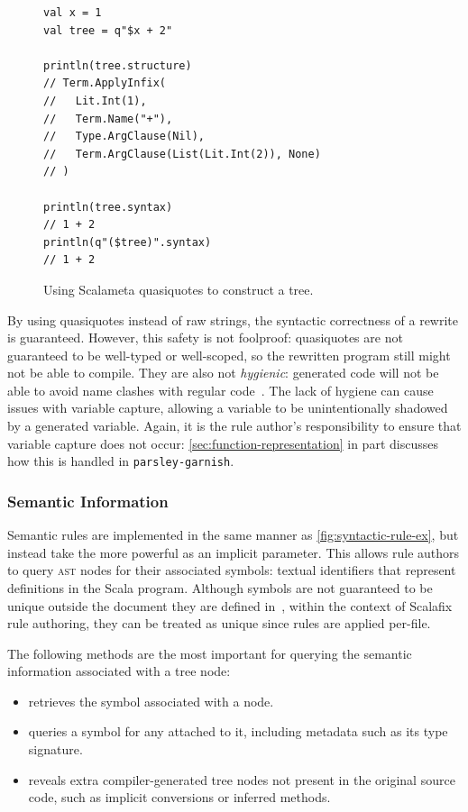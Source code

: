 \documentclass[../../main.tex]{subfiles}
\begin{document}
\begin{figure}[htbp]
\begin{verbatim}
val x = 1
val tree = q"$x + 2"

println(tree.structure)
// Term.ApplyInfix(
//   Lit.Int(1),
//   Term.Name("+"),
//   Type.ArgClause(Nil),
//   Term.ArgClause(List(Lit.Int(2)), None)
// )

println(tree.syntax)
// 1 + 2
println(q"($tree)".syntax)
// 1 + 2
\end{verbatim}
\caption{Using Scalameta quasiquotes to construct a tree.}
\label{fig:quasiquote-ex}
\end{figure}

By using quasiquotes instead of raw strings, the syntactic correctness of a rewrite is guaranteed.
However, this safety is not foolproof: quasiquotes are not guaranteed to be well-typed or well-scoped, so the rewritten program still might not be able to compile.
They are also not \emph{hygienic}: generated code will not be able to avoid name clashes with regular code~\cite{burmako_scalameta_2017}.
The lack of hygiene can cause issues with variable capture, allowing a variable to be unintentionally shadowed by a generated variable.
Again, it is the rule author's responsibility to ensure that variable capture does not occur: \cref{sec:function-representation} in part discusses how this is handled in \texttt{parsley-garnish}.

\subsubsection{Semantic Information}
Semantic rules are implemented in the same manner as \cref{fig:syntactic-rule-ex}, but instead take the more powerful  as an implicit parameter.
This allows rule authors to query \textsc{ast} nodes for their associated symbols: textual identifiers that represent definitions in the Scala program.
Although symbols are not guaranteed to be unique outside the document they are defined in~\cite{scalameta_semanticdb_spec_2023}, within the context of Scalafix rule authoring, they can be treated as unique since rules are applied per-file.

The following methods are the most important for querying the semantic information associated with a tree node:
\begin{itemize}
  \item {} retrieves the symbol associated with a node.
  \item {} queries a symbol for any  attached to it, including metadata such as its type signature.
  \item {} reveals extra compiler-generated tree nodes not present in the original source code, such as implicit conversions or inferred  methods.
\end{itemize}
\end{document}
